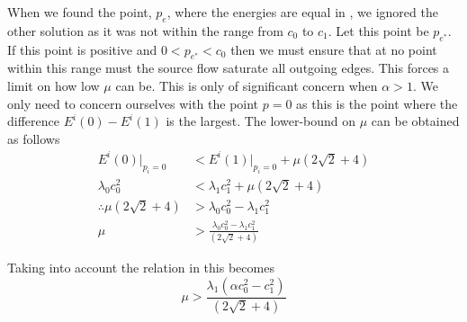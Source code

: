 \begin{definition}
	When we found the point, $p_e$, where the energies are equal in , we ignored the other solution as it was not within the range from $c_0$ to $c_1$. Let this point be $p_{e^*}$. If this point is positive and $0<p_{e^*}<c_0$ then we must ensure that at no point within this range must the source flow saturate all outgoing edges. This forces a limit on how low $\mu$ can be. This is only of significant concern when $\alpha>1$. We only need to concern ourselves with the point $p=0$ as this is the point where the difference $E^i(0)-E^i(1)$ is the largest. The lower-bound on $\mu$ can be obtained as follows
	\begin{equation*}\begin{split}
		E^i(0)|_{p_i=0} &< E^i(1)|_{p_i=0} + \mu \left( 2\sqrt{2} + 4\right) \\
		\lambda_0c_0^2 &< \lambda_1c_1^2 + \mu \left( 2\sqrt{2} + 4\right) \\
		\therefore \mu \left( 2\sqrt{2} + 4\right) &> \lambda_0c_0^2 - \lambda_1c_1^2\\
		\mu &> \frac{\lambda_0c_0^2 - \lambda_1c_1^2}{\left( 2\sqrt{2} + 4\right)}
	\end{split}\end{equation*} 
\end{definition}
Taking into account the relation in  this becomes
\begin{equation}
	\mu > \frac{\lambda_1(\alpha c_0^2-c_1^2)}{\left( 2\sqrt{2} + 4\right)}
	\label{eq:mulowerbound}
\end{equation}

